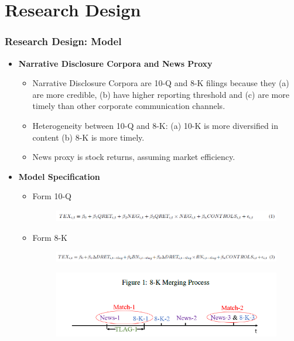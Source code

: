 \documentclass{beamer}
\begin{document}
\section{Research Design}
\begin{frame}
\frametitle{Research Design: Model}
\begin{itemize}

\item \textbf{Narrative Disclosure Corpora and News Proxy}

\begin{itemize}
	\item Narrative Disclosure Corpora are 10-Q and 8-K filings because they (a) are more credible, (b) have higher reporting threshold and (c) are more timely than other corporate communication channels.
	\item Heterogeneity between 10-Q and 8-K: (a) 10-K is more diversified in content (b) 8-K is more timely.
	\item News proxy is stock returns, assuming market efficiency.
\end{itemize}

\item \textbf{Model Specification}
	\begin{itemize}
		\item Form 10-Q
		
		\begin{figure}[h]
			\centering
			\includegraphics[width=0.75\linewidth]{eq1}
			\label{eq1}
		\end{figure}
	
		\item Form 8-K
		
		\begin{figure}[h]
			\centering
			\includegraphics[width=0.8\linewidth]{eq3}
			\label{eq3}
		\end{figure}
	
		\begin{figure}[h]
			\centering
			\includegraphics[width=0.6\linewidth]{fig1}
			\label{fig1}
		\end{figure}
	\end{itemize}

\end{itemize}
\end{frame}
\end{document}
